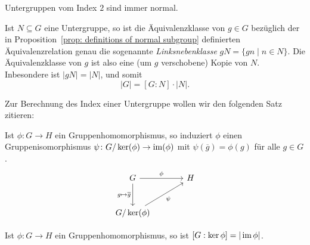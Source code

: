 \begin{remark}
  Untergruppen vom Index $2$ sind immer normal.
\end{remark}


\begin{remark}
  Ist $N \subseteq G$ eine Untergruppe, so ist die Äquivalenzklasse von $g \in G$ bezüglich der in Proposition~\ref{prop: definitions of normal subgroup} definierten Äquivalenzrelation genau die sogenannte \emph{Linksnebenklasse} $gN = \{gn \mid n \in N\}$. 
  Die Äquivalenzklasse von $g$ ist also eine (um $g$ verschobene) Kopie von $N$.
  Inbesondere ist $|gN| = |N|$, und somit
  \[
    |G| = [G : N] \cdot |N|.
  \]
\end{remark}


Zur Berechnung des Index einer Untergruppe wollen wir den folgenden Satz zitieren:


\begin{theorem}[1.\ Isomorphiesatz]
  Ist $\phi \colon G \to H$ ein Gruppenhomomorphismus, so induziert $\phi$ einen Gruppenisomorphismus $\psi \colon G/\ker(\phi) \to \operatorname{im}(\phi)$ mit $\psi(\overline{g}) = \phi(g)$ für alle $g \in G$.
  \[
    \begin{tikzcd}[row sep = large, column sep = large]
        G
        \arrow[r, "\phi"]
        \arrow[d, "g \mapsto \overline{g}"']
      & H
      \\
        G/\ker(\phi)
        \arrow[ru, "\psi"']
      & {}
    \end{tikzcd}
  \]
\end{theorem}


\begin{corollary}
  Ist $\phi \colon G \to H$ ein Gruppenhomomorphismus, so ist $[G : \ker \phi] = |\operatorname{im} \phi|$.
\end{corollary}



